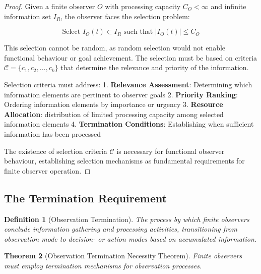 \documentclass[12pt,a4paper]{article}
\newtheorem{theorem}{Theorem}[section]
\newtheorem{definition}[theorem]{Definition}
\begin{document}
\begin{proof}
Given a finite observer $O$ with processing capacity $C_O < \infty$ and infinite information set $I_R$, the observer faces the selection problem:

$$\text{Select } I_O(t) \subset I_R \text{ such that } |I_O(t)| \leq C_O$$

This selection cannot be random, as random selection would not enable functional behaviour or goal achievement. The selection must be based on criteria $\mathcal{C} = \{c_1, c_2, ..., c_k\}$ that determine the relevance and priority of the information.

Selection criteria must address:
1. \textbf{Relevance Assessment}: Determining which information elements are pertinent to observer goals
2. \textbf{Priority Ranking}: Ordering information elements by importance or urgency
3. \textbf{Resource Allocation}: distribution of limited processing capacity among selected information elements
4. \textbf{Termination Conditions}: Establishing when sufficient information has been processed

The existence of selection criteria $\mathcal{C}$ is necessary for functional observer behaviour, establishing selection mechanisms as fundamental requirements for finite observer operation.
\end{proof}

\subsection{The Termination Requirement}

\begin{definition}[Observation Termination]
The process by which finite observers conclude information gathering and processing activities, transitioning from observation mode to decision- or action modes based on accumulated information.
\end{definition}

\begin{theorem}[Observation Termination Necessity Theorem]
Finite observers must employ termination mechanisms for observation processes.
\end{theorem}
\end{document}

